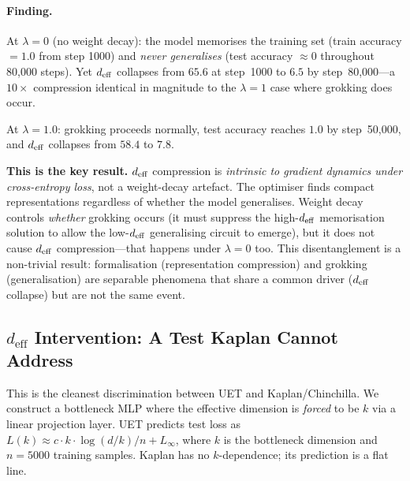 \paragraph{Finding.}
At $\lambda = 0$ (no weight decay): the model memorises the training set
(train accuracy $= 1.0$ from step 1000) and \emph{never generalises}
(test accuracy $\approx 0$ throughout 80{,}000 steps).
Yet $d_{\mathrm{eff}}$ collapses from $65.6$ at step~1000 to $6.5$ by step~80{,}000---a
$10\times$ compression identical in magnitude to the $\lambda=1$ case where
grokking does occur.

At $\lambda = 1.0$: grokking proceeds normally, test accuracy reaches $1.0$
by step~50{,}000, and $d_{\mathrm{eff}}$ collapses from $58.4$ to $7.8$.

\textbf{This is the key result.}
$d_{\mathrm{eff}}$ compression is \emph{intrinsic to gradient dynamics under cross-entropy loss},
not a weight-decay artefact.
The optimiser finds compact representations regardless of whether the model generalises.
Weight decay controls \emph{whether} grokking occurs (it must suppress the high-$d_{\mathrm{eff}}$
memorisation solution to allow the low-$d_{\mathrm{eff}}$ generalising circuit to emerge),
but it does not cause $d_{\mathrm{eff}}$ compression---that happens under $\lambda = 0$ too.
This disentanglement is a non-trivial result: formalisation (representation compression)
and grokking (generalisation) are separable phenomena that share a common
driver ($d_{\mathrm{eff}}$ collapse) but are not the same event.

\subsection{$d_\mathrm{eff}$ Intervention: A Test Kaplan Cannot Address}
\label{sec:deff-intervention}

This is the cleanest discrimination between UET and Kaplan/Chinchilla.
We construct a bottleneck MLP where the effective dimension is \emph{forced}
to be $k$ via a linear projection layer.
UET predicts test loss as $L(k) \approx c \cdot k \cdot \log(d/k) / n + L_\infty$,
where $k$ is the bottleneck dimension and $n = 5000$ training samples.
Kaplan has no $k$-dependence; its prediction is a flat line.

